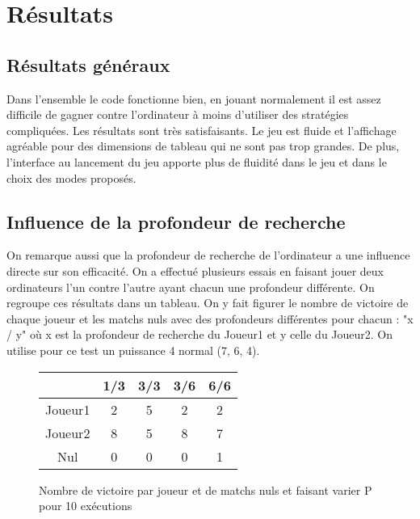\documentclass[a4paper, 10pt, french]{article}
\begin{document}
\section{Résultats}
{

    \subsection{Résultats généraux}
    {
        Dans l'ensemble le code fonctionne bien, en jouant normalement il est assez difficile de gagner contre l'ordinateur à moins
        d'utiliser des stratégies compliquées. Les résultats sont très satisfaisants. Le jeu est fluide et l'affichage agréable
        pour des dimensions de tableau qui ne sont pas trop grandes.
        De plus, l'interface au lancement du jeu apporte plus de fluidité dans le jeu et dans le choix des modes proposés.
    }

    \subsection{Influence de la profondeur de recherche}
    {
        On remarque aussi que la profondeur de recherche de l'ordinateur a une influence directe sur son efficacité. On a effectué
        plusieurs essais en faisant jouer deux ordinateurs l'un contre l'autre ayant chacun une profondeur différente. On regroupe
        ces résultats dans un tableau. On y fait figurer le nombre de victoire de chaque joueur et les matchs nuls avec des
        profondeurs différentes pour chacun : "x / y" où x est la profondeur de recherche du Joueur1 et y celle du Joueur2.
        On utilise pour ce test un puissance 4 normal (7, 6, 4).

        \begin{figure}[h]
            \begin{center}
                \begin{tabular}{|c|c|c|c|c|}
                    \hline
                            &1/3&3/3&3/6&6/6\\
                    \hline
                    \hline
                    Joueur1 & 2 & 5 & 2 & 2 \\
                    \hline
                    Joueur2 & 8 & 5 & 8 & 7 \\
                    \hline
                    Nul     & 0 & 0 & 0 & 1 \\
                    \hline
                    \hline
                \end{tabular}
                \caption{Nombre de victoire par joueur et de matchs nuls et faisant varier P pour 10 exécutions}
                \label{table-temps}
            \end{center}
        \end{figure}

}}
\end{document}
